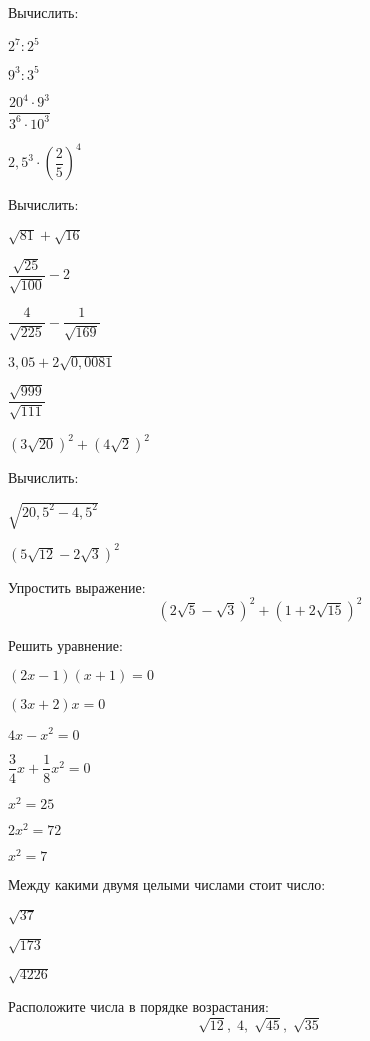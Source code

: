 %
%
\begin{exam}
	\begin{listofex}
		\item Вычислить:
		\begin{enumcols}[itemcolumns=3]
			\item \( 2^7:2^5 \)
			\item \( 9^3:3^5 \)
			\item \( \dfrac{20^4\cdot9^3}{3^6\cdot10^3} \)
			\item \( 2,5^3\cdot\left( \dfrac{2}{5} \right)^4 \)
		\end{enumcols}
		\item Вычислить:
		\begin{enumcols}[itemcolumns=3]
			\item \( \sqrt{81}+\sqrt{16} \)
			\item \( \dfrac{\sqrt{25}}{\sqrt{100}}-2 \)
			\item \( \dfrac{4}{\sqrt{225}}-\dfrac{1}{\sqrt{169}} \)
			\item \( 3,05+2\sqrt{0,0081} \)
			\item \( \dfrac{\sqrt{999}}{\sqrt{111}} \)
			\item \( (3\sqrt{20})^2+(4\sqrt{2})^2 \)
		\end{enumcols}
		\item Вычислить:
		\begin{enumcols}[itemcolumns=2]
			\item \( \sqrt{20,5^2-4,5^2} \)
			\item \( (5\sqrt{12}-2\sqrt{3})^2 \)
		\end{enumcols}
		\item Упростить выражение:
		\[ (2\sqrt{5}-\sqrt{3})^2+(1+2\sqrt{15})^2 \]
		\item Решить уравнение:
		\begin{enumcols}[itemcolumns=3]
			\item \( (2x-1)(x+1)=0 \)
			\item \( (3x+2)x=0 \)
			\item \( 4x-x^2=0 \)
			\item \( \dfrac{3}{4}x+\dfrac{1}{8}x^2=0 \)
			\item \( x^2=25 \)
			\item \( 2x^2=72 \)
			\item \( x^2=7 \)
		\end{enumcols}
		\item Между какими двумя целыми числами стоит число:
		\begin{enumcols}[itemcolumns=3]
			\item \( \sqrt{37} \)
			\item \( \sqrt{173} \)
			\item \( \sqrt{4226} \)
		\end{enumcols}
		\item Расположите числа в порядке возрастания:
		\[ \sqrt{12},\;4,\;\sqrt{45},\;\sqrt{35} \]
	\end{listofex}
\end{exam}